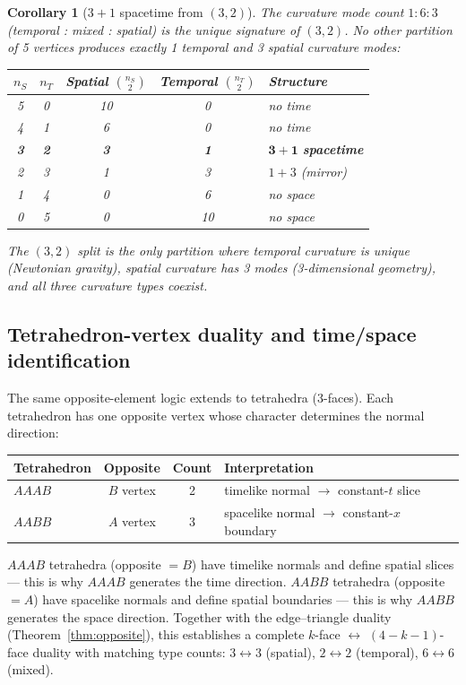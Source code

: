 \documentclass[12pt,a4paper]{article}
\newtheorem{corollary}[theorem]{Corollary}
\newcommand{\nS}{n_S}
\newcommand{\nT}{n_T}
\begin{document}
\begin{corollary}[$3+1$ spacetime from $(3,2)$]
\label{cor:31}
The curvature mode count $1:6:3$ (temporal : mixed : spatial)
is the unique signature of $(3,2)$.  No other partition of 5
vertices produces exactly 1 temporal and 3 spatial curvature
modes:
\begin{center}
\begin{tabular}{ccccl}
\toprule
$\nS$ & $\nT$ & Spatial $\binom{\nS}{2}$ & Temporal $\binom{\nT}{2}$ & Structure \\
\midrule
5 & 0 & 10 & 0 & no time \\
4 & 1 & 6 & 0 & no time \\
\textbf{3} & \textbf{2} & \textbf{3} & \textbf{1} & $\boldsymbol{3+1}$ \textbf{spacetime} \\
2 & 3 & 1 & 3 & $1+3$ (mirror) \\
1 & 4 & 0 & 6 & no space \\
0 & 5 & 0 & 10 & no space \\
\bottomrule
\end{tabular}
\end{center}
The $(3,2)$ split is the \emph{only} partition where
temporal curvature is unique (Newtonian gravity),
spatial curvature has 3 modes (3-dimensional geometry),
and all three curvature types coexist.
\end{corollary}

\subsection{Tetrahedron-vertex duality and time/space identification}

The same opposite-element logic extends to tetrahedra (3-faces).
Each tetrahedron has one opposite vertex whose character
determines the normal direction:

\begin{center}
\begin{tabular}{lccl}
\toprule
Tetrahedron & Opposite & Count & Interpretation \\
\midrule
$AAAB$ & $B$ vertex & 2 & timelike normal $\to$ constant-$t$ slice \\
$AABB$ & $A$ vertex & 3 & spacelike normal $\to$ constant-$x$ boundary \\
\bottomrule
\end{tabular}
\end{center}

$AAAB$ tetrahedra (opposite $= B$) have timelike normals
and define spatial slices --- this is why $AAAB$ generates
the time direction.
$AABB$ tetrahedra (opposite $= A$) have spacelike normals
and define spatial boundaries --- this is why $AABB$
generates the space direction.
Together with the edge--triangle duality (Theorem~\ref{thm:opposite}),
this establishes a complete
$k$-face $\leftrightarrow$ $(4-k-1)$-face duality with
matching type counts: $3 \leftrightarrow 3$ (spatial),
$2 \leftrightarrow 2$ (temporal), $6 \leftrightarrow 6$ (mixed).
\end{document}

